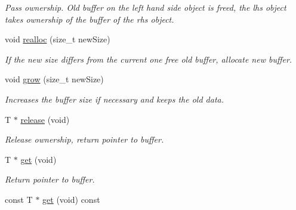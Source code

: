 \begin{DoxyCompactItemize}
\begin{DoxyCompactList}\small\item\em Pass ownership. Old buffer on the left hand side object is freed, the lhs object takes ownership of the buffer of the rhs object. \end{DoxyCompactList}\item 
\hypertarget{classauto__array__ptr_a050d1e439d4a5f1085228b9a7ac3ad30}{void \hyperlink{classauto__array__ptr_a050d1e439d4a5f1085228b9a7ac3ad30}{realloc} (size\+\_\+t new\+Size)}\label{classauto__array__ptr_a050d1e439d4a5f1085228b9a7ac3ad30}

\begin{DoxyCompactList}\small\item\em If the new size differs from the current one free old buffer, allocate new buffer. \end{DoxyCompactList}\item 
\hypertarget{classauto__array__ptr_a45ebd42a6f063da7e1b7ec6a50de0809}{void \hyperlink{classauto__array__ptr_a45ebd42a6f063da7e1b7ec6a50de0809}{grow} (size\+\_\+t new\+Size)}\label{classauto__array__ptr_a45ebd42a6f063da7e1b7ec6a50de0809}

\begin{DoxyCompactList}\small\item\em Increases the buffer size if necessary and keeps the old data. \end{DoxyCompactList}\item 
\hypertarget{classauto__array__ptr_a839bd21e30adb228309c8389822c2ddb}{T $\ast$ \hyperlink{classauto__array__ptr_a839bd21e30adb228309c8389822c2ddb}{release} (void)}\label{classauto__array__ptr_a839bd21e30adb228309c8389822c2ddb}

\begin{DoxyCompactList}\small\item\em Release ownership, return pointer to buffer. \end{DoxyCompactList}\item 
\hypertarget{classauto__array__ptr_a89d539e5f0344897d201b5ffa808f905}{T $\ast$ \hyperlink{classauto__array__ptr_a89d539e5f0344897d201b5ffa808f905}{get} (void)}\label{classauto__array__ptr_a89d539e5f0344897d201b5ffa808f905}

\begin{DoxyCompactList}\small\item\em Return pointer to buffer. \end{DoxyCompactList}\item 
\hypertarget{classauto__array__ptr_adb64bcb6c67b17bead719ed67fb190c7}{const T $\ast$ \hyperlink{classauto__array__ptr_adb64bcb6c67b17bead719ed67fb190c7}{get} (void) const }\label{classauto__array__ptr_adb64bcb6c67b17bead719ed67fb190c7}


\end{DoxyCompactItemize}
